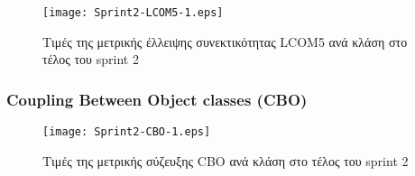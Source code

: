 \begin{figure}
\centering
\texttt{[image: Sprint2-LCOM5-1.eps]}
\caption{Τιμές της μετρικής έλλειψης συνεκτικότητας LCOM5 ανά κλάση στο τέλος του sprint 2}
\label{fig:sprint2LCOM5}
\end{figure}

\subsubsection{Coupling Between Object classes (CBO)}
\label{section:sprint2CBO}

\begin{figure}
\centering
\texttt{[image: Sprint2-CBO-1.eps]}
\caption{Τιμές της μετρικής σύζευξης CBO ανά κλάση στο τέλος του sprint 2}
\label{fig:sprint2CBO}
\end{figure}
